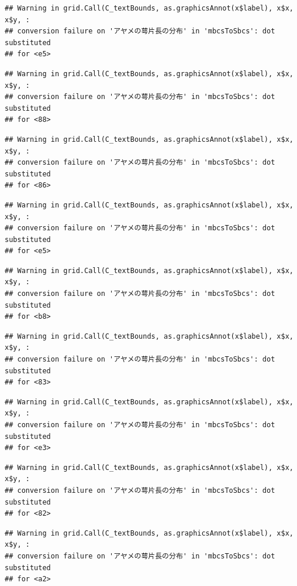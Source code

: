 \documentclass[
]{book}
\begin{document}
\begin{verbatim}
## Warning in grid.Call(C_textBounds, as.graphicsAnnot(x$label), x$x, x$y, :
## conversion failure on 'アヤメの萼片長の分布' in 'mbcsToSbcs': dot substituted
## for <e5>
\end{verbatim}

\begin{verbatim}
## Warning in grid.Call(C_textBounds, as.graphicsAnnot(x$label), x$x, x$y, :
## conversion failure on 'アヤメの萼片長の分布' in 'mbcsToSbcs': dot substituted
## for <88>
\end{verbatim}

\begin{verbatim}
## Warning in grid.Call(C_textBounds, as.graphicsAnnot(x$label), x$x, x$y, :
## conversion failure on 'アヤメの萼片長の分布' in 'mbcsToSbcs': dot substituted
## for <86>
\end{verbatim}

\begin{verbatim}
## Warning in grid.Call(C_textBounds, as.graphicsAnnot(x$label), x$x, x$y, :
## conversion failure on 'アヤメの萼片長の分布' in 'mbcsToSbcs': dot substituted
## for <e5>
\end{verbatim}

\begin{verbatim}
## Warning in grid.Call(C_textBounds, as.graphicsAnnot(x$label), x$x, x$y, :
## conversion failure on 'アヤメの萼片長の分布' in 'mbcsToSbcs': dot substituted
## for <b8>
\end{verbatim}

\begin{verbatim}
## Warning in grid.Call(C_textBounds, as.graphicsAnnot(x$label), x$x, x$y, :
## conversion failure on 'アヤメの萼片長の分布' in 'mbcsToSbcs': dot substituted
## for <83>
\end{verbatim}

\begin{verbatim}
## Warning in grid.Call(C_textBounds, as.graphicsAnnot(x$label), x$x, x$y, :
## conversion failure on 'アヤメの萼片長の分布' in 'mbcsToSbcs': dot substituted
## for <e3>
\end{verbatim}

\begin{verbatim}
## Warning in grid.Call(C_textBounds, as.graphicsAnnot(x$label), x$x, x$y, :
## conversion failure on 'アヤメの萼片長の分布' in 'mbcsToSbcs': dot substituted
## for <82>
\end{verbatim}

\begin{verbatim}
## Warning in grid.Call(C_textBounds, as.graphicsAnnot(x$label), x$x, x$y, :
## conversion failure on 'アヤメの萼片長の分布' in 'mbcsToSbcs': dot substituted
## for <a2>
\end{verbatim}
\end{document}
